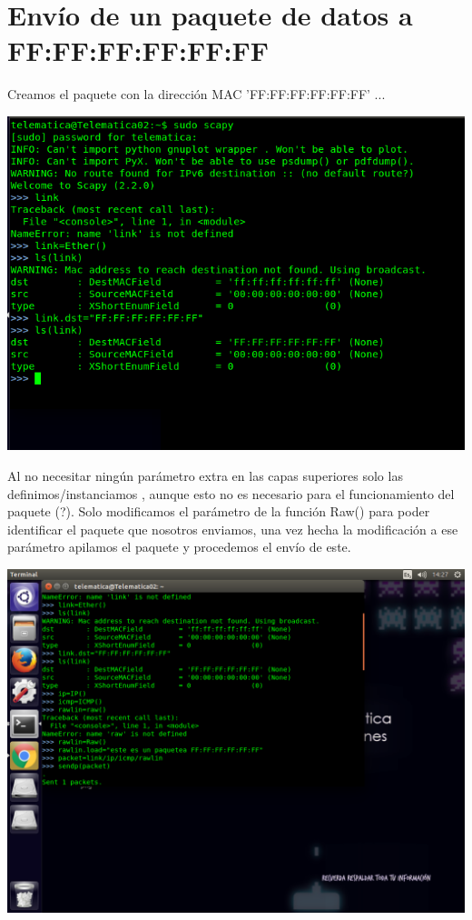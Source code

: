 \documentclass[spanish]{udpreport}
\begin{document}
\section{Envío de un paquete de datos a FF:FF:FF:FF:FF:FF}

Creamos el paquete con la dirección MAC 'FF:FF:FF:FF:FF:FF' ...

\begin{center}
	\includegraphics[scale=.37]{imagenes/Switch/Test_1a_b.png}
\end{center}

Al no necesitar ningún parámetro extra en las capas superiores solo las definimos/instanciamos , aunque esto no es necesario para el funcionamiento del paquete (?). Solo modificamos el parámetro de la función Raw() para poder identificar el paquete que nosotros enviamos, una vez hecha la modificación a ese parámetro apilamos el paquete y procedemos el envío de este.

\begin{center}
	\includegraphics[scale=.37]{imagenes/Switch/Test_1b.png}
\end{center}
\end{document}
